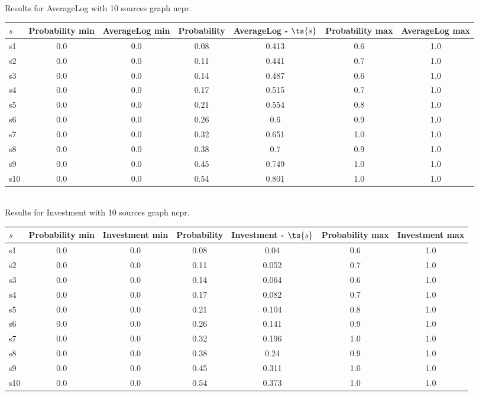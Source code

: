 \documentclass{article}
\begin{document}
\noindent Results for AverageLog with 10 sources graph ncpr.

\noindent\begin{tabular}{|l|c|c|c|c|c|c|}
\hline
$s$& Probability min & AverageLog min & Probability & AverageLog - $\ts{s}$ & Probability max & AverageLog max\\
\hline
s1 &0.0 & 0.0 & 0.08 & 0.413 & 0.6 & 1.0\\
\hline
s2 &0.0 & 0.0 & 0.11 & 0.441 & 0.7 & 1.0\\
\hline
s3 &0.0 & 0.0 & 0.14 & 0.487 & 0.6 & 1.0\\
\hline
s4 &0.0 & 0.0 & 0.17 & 0.515 & 0.7 & 1.0\\
\hline
s5 &0.0 & 0.0 & 0.21 & 0.554 & 0.8 & 1.0\\
\hline
s6 &0.0 & 0.0 & 0.26 & 0.6 & 0.9 & 1.0\\
\hline
s7 &0.0 & 0.0 & 0.32 & 0.651 & 1.0 & 1.0\\
\hline
s8 &0.0 & 0.0 & 0.38 & 0.7 & 0.9 & 1.0\\
\hline
s9 &0.0 & 0.0 & 0.45 & 0.749 & 1.0 & 1.0\\
\hline
s10 &0.0 & 0.0 & 0.54 & 0.801 & 1.0 & 1.0\\
\hline
\end{tabular}\\

\noindent Results for Investment with 10 sources graph ncpr.

\noindent\begin{tabular}{|l|c|c|c|c|c|c|}
\hline
$s$& Probability min & Investment min & Probability & Investment - $\ts{s}$ & Probability max & Investment max\\
\hline
s1 &0.0 & 0.0 & 0.08 & 0.04 & 0.6 & 1.0\\
\hline
s2 &0.0 & 0.0 & 0.11 & 0.052 & 0.7 & 1.0\\
\hline
s3 &0.0 & 0.0 & 0.14 & 0.064 & 0.6 & 1.0\\
\hline
s4 &0.0 & 0.0 & 0.17 & 0.082 & 0.7 & 1.0\\
\hline
s5 &0.0 & 0.0 & 0.21 & 0.104 & 0.8 & 1.0\\
\hline
s6 &0.0 & 0.0 & 0.26 & 0.141 & 0.9 & 1.0\\
\hline
s7 &0.0 & 0.0 & 0.32 & 0.196 & 1.0 & 1.0\\
\hline
s8 &0.0 & 0.0 & 0.38 & 0.24 & 0.9 & 1.0\\
\hline
s9 &0.0 & 0.0 & 0.45 & 0.311 & 1.0 & 1.0\\
\hline
s10 &0.0 & 0.0 & 0.54 & 0.373 & 1.0 & 1.0\\
\hline
\end{tabular}\\
\end{document}
